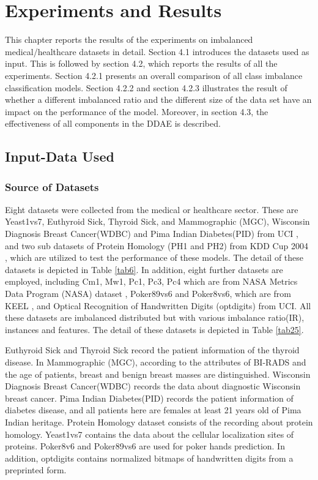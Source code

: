 \chapter{Experiments and Results}
This chapter reports the results of the experiments on imbalanced medical/healthcare datasets in detail. Section 4.1 introduces the datasets used as input. This is followed by section 4.2, which reports the results of all the experiments. Section 4.2.1 presents an overall comparison of all class imbalance classification models. Section 4.2.2 and section 4.2.3 illustrates the result of whether a different imbalanced ratio and the different size of the data set have an impact on the performance of the model. Moreover, in section 4.3, the effectiveness of all components in the DDAE is described. 

\section{Input-Data Used}
\subsection{Source of Datasets}
Eight datasets were collected from the medical or healthcare sector. These are Yeast1vs7, Euthyroid Sick, Thyroid Sick, and Mammographic (MGC), Wisconsin Diagnosis Breast Cancer(WDBC) and Pima Indian Diabetes(PID) from UCI \cite{97}, and two sub datasets of Protein Homology (PH1 and PH2) from KDD Cup 2004 \cite{109}, which are utilized to test the performance of these models. The detail of these datasets is depicted in Table \ref{tab6}. In addition, eight further datasets are employed, including Cm1, Mw1, Pc1, Pc3, Pc4 which are from NASA Metrics Data Program (NASA) dataset \cite{110}, Poker89vs6 and Poker8vs6, which are from KEEL \cite{98}, and Optical Recognition of Handwritten Digits (optdigits) from UCI. All these datasets are imbalanced distributed but with various imbalance ratio(IR), instances and features. The detail of these datasets is depicted in Table \ref{tab25}.

Euthyroid Sick and Thyroid Sick record the patient information of the thyroid disease. In Mammographic (MGC), according to the attributes of BI-RADS and the age of patients, breast and benign breast masses are distinguished. Wisconsin Diagnosis Breast Cancer(WDBC) records the data about diagnostic Wisconsin breast cancer. Pima Indian Diabetes(PID) records the patient information of diabetes disease, and all patients here are females at least 21 years old of Pima Indian heritage. Protein Homology dataset consists of the recording about protein homology. Yeast1vs7 contains the data about  the cellular localization sites of proteins. Poker8v6 and Poker89vs6 are used for poker hands prediction. In addition, optdigits contains normalized bitmaps of handwritten digits from a preprinted form.

